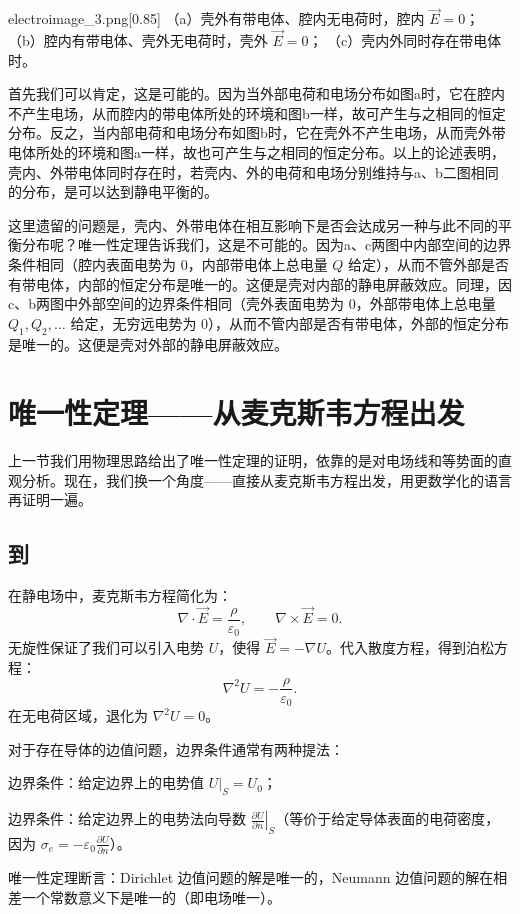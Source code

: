 \begin{so}[静电屏蔽]
    \begin{singlefigure}[静电屏蔽的三个情形]{electroimage_3.png}[0.85]
        （a）壳外有带电体、腔内无电荷时，腔内 $\vec{E}=0$；
        （b）腔内有带电体、壳外无电荷时，壳外 $\vec{E}=0$；
        （c）壳内外同时存在带电体时。
    \end{singlefigure}

    首先我们可以肯定，这是可能的。因为当外部电荷和电场分布如图a时，它在腔内不产生电场，从而腔内的带电体所处的环境和图b一样，故可产生与之相同的恒定分布。反之，当内部电荷和电场分布如图b时，它在壳外不产生电场，从而壳外带电体所处的环境和图a一样，故也可产生与之相同的恒定分布。以上的论述表明，壳内、外带电体同时存在时，若壳内、外的电荷和电场分别维持与a、b二图相同的分布，是可以达到静电平衡的。

    这里遗留的问题是，壳内、外带电体在相互影响下是否会达成另一种与此不同的平衡分布呢？唯一性定理告诉我们，这是不可能的。因为a、c两图中内部空间的边界条件相同（腔内表面电势为 $0$，内部带电体上总电量 $Q$ 给定），从而不管外部是否有带电体，内部的恒定分布是唯一的。这便是壳对内部的静电屏蔽效应。同理，因c、b两图中外部空间的边界条件相同（壳外表面电势为 $0$，外部带电体上总电量 $Q_1, Q_2, \ldots$ 给定，无穷远电势为 $0$），从而不管内部是否有带电体，外部的恒定分布是唯一的。这便是壳对外部的静电屏蔽效应。
\end{so}


\section{唯一性定理——从麦克斯韦方程出发}

上一节我们用物理思路给出了唯一性定理的证明，依靠的是对电场线和等势面的直观分析。现在，我们换一个角度——直接从麦克斯韦方程出发，用更数学化的语言再证明一遍。

\subsection[从麦克斯韦方程到泊松方程]{到}

在静电场中，麦克斯韦方程简化为：
\[\nabla \cdot \vec{E} = \frac{\rho}{\varepsilon_0}, \qquad \nabla \times \vec{E} = 0.\]
无旋性保证了我们可以引入电势 $U$，使得 $\vec{E} = -\nabla U$。代入散度方程，得到泊松方程：
\[\nabla^2 U = -\frac{\rho}{\varepsilon_0}.\]
在无电荷区域，退化为 $\nabla^2 U = 0$。

对于存在导体的边值问题，边界条件通常有两种提法：
\begin{Itemize}
    \item {}边界条件：给定边界上的电势值 $U|_S = U_0$；
    \item {}边界条件：给定边界上的电势法向导数 $\left.\frac{\partial U}{\partial n}\right|_S$（等价于给定导体表面的电荷密度，因为 $\sigma_e = -\varepsilon_0 \frac{\partial U}{\partial n}$）。
\end{Itemize}
唯一性定理断言：Dirichlet 边值问题的解是唯一的，Neumann 边值问题的解在相差一个常数意义下是唯一的（即电场唯一）。


